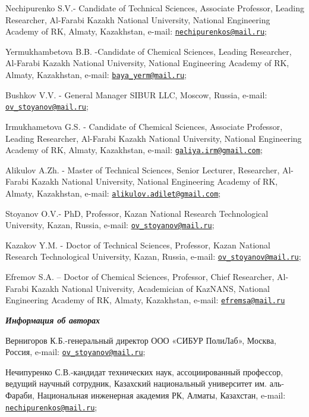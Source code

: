 Nechipurenko S.V.- Candidate of Technical Sciences, Associate Professor,
Leading Researcher, Al-Farabi Kazakh National University, National
Engineering Academy of RK, Almaty, Kazakhstan, e-mail:
\href{mailto:nechipurenkos@mail.ru}{\nolinkurl{nechipurenkos@mail.ru}};

Yermukhambetova B.B. -Candidate of Chemical Sciences, Leading
Researcher, Al-Farabi Kazakh National University, National Engineering
Academy of RK, Almaty, Kazakhstan, e-mail:
\href{mailto:baya_yerm@mail.ru}{\nolinkurl{baya\_yerm@mail.ru}};

Bushkov V.V. - General Manager SIBUR LLC, Moscow, Russia, e-mail:
\href{mailto:ov_stoyanov@mail.ru}{\nolinkurl{ov\_stoyanov@mail.ru}};

Irmukhametova G.S. - Candidate of Chemical Sciences, Associate
Professor, Leading Researcher, Al-Farabi Kazakh National University,
National Engineering Academy of RK, Almaty, Kazakhstan, e-mail:
\href{mailto:galiya.irm@gmail.com}{\nolinkurl{galiya.irm@gmail.com}};

Alikulov A.Zh. - Master of Technical Sciences, Senior Lecturer,
Researcher, Al-Farabi Kazakh National University, National Engineering
Academy of RK, Almaty, Kazakhstan, e-mail:
\href{mailto:alikulov.adilet@gmail.com}{\nolinkurl{alikulov.adilet@gmail.com}};

Stoyanov O.V.- PhD, Professor, Kazan National Research Technological
University, Kazan, Russia, e-mail:
\href{mailto:ov_stoyanov@mail.ru}{\nolinkurl{ov\_stoyanov@mail.ru}};

Kazakov Y.M. - Doctor of Technical Sciences, Professor, Kazan National
Research Technological University, Kazan, Russia, e-mail:
\href{mailto:ov_stoyanov@mail.ru}{\nolinkurl{ov\_stoyanov@mail.ru}};

Efremov S.A. -- Doctor of Chemical Sciences, Professor, Chief
Researcher, Al-Farabi Kazakh National University, Academician of
KazNANS, National Engineering Academy of RK, Almaty, Kazakhstan, e-mail:
\href{mailto:efremsa@mail.ru}{\nolinkurl{efremsa@mail.ru}}

\emph{{\bfseries Информация об авторах}}

Вернигоров К.Б.-генеральный директор ООО «СИБУР ПолиЛаб», Москва,
Россия, e-mail:
\href{mailto:ov_stoyanov@mail.ru}{\nolinkurl{ov\_stoyanov@mail.ru}};

Нечипуренко С.В.-кандидат технических наук, ассоциированный профессор,
ведущий научный сотрудник, Казахский национальный университет им.
аль-Фараби, Национальная инженерная академия РК, Алматы, Казахстан,
e-mail:
\href{mailto:nechipurenkos@mail.ru}{\nolinkurl{nechipurenkos@mail.ru}};

